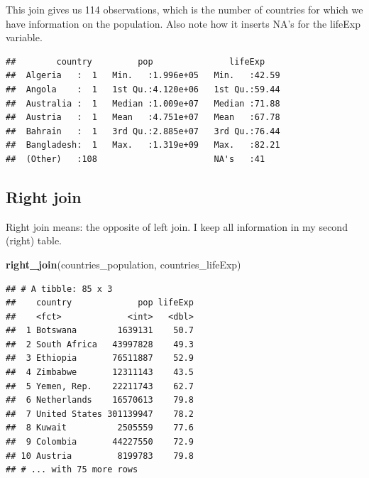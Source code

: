 \documentclass[]{tufte-book}
\newenvironment{Shaded}{}{}
\newcommand{\KeywordTok}[1]{\textcolor[rgb]{0.00,0.44,0.13}{\textbf{#1}}}
\newcommand{\NormalTok}[1]{#1}
\newcommand{\OperatorTok}[1]{\textcolor[rgb]{0.40,0.40,0.40}{#1}}
\newcommand{\StringTok}[1]{\textcolor[rgb]{0.25,0.44,0.63}{#1}}
\begin{document}
This join gives us 114 observations, which is the number of countries for which we have information on the population. Also note how it inserts NA's for the lifeExp variable.

\begin{Shaded}
\end{Shaded}

\begin{verbatim}
##        country         pop               lifeExp     
##  Algeria   :  1   Min.   :1.996e+05   Min.   :42.59  
##  Angola    :  1   1st Qu.:4.120e+06   1st Qu.:59.44  
##  Australia :  1   Median :1.009e+07   Median :71.88  
##  Austria   :  1   Mean   :4.751e+07   Mean   :67.78  
##  Bahrain   :  1   3rd Qu.:2.885e+07   3rd Qu.:76.44  
##  Bangladesh:  1   Max.   :1.319e+09   Max.   :82.21  
##  (Other)   :108                       NA's   :41
\end{verbatim}

\hypertarget{right-join}{%
\subsection{Right join}\label{right-join}}

Right join means: the opposite of left join. I keep all information in my second (right) table.

\begin{Shaded}
\begin{Highlighting}[]
\KeywordTok{right_join}\NormalTok{(countries_population, countries_lifeExp)}
\end{Highlighting}
\end{Shaded}

\begin{verbatim}
## # A tibble: 85 x 3
##    country             pop lifeExp
##    <fct>             <int>   <dbl>
##  1 Botswana        1639131    50.7
##  2 South Africa   43997828    49.3
##  3 Ethiopia       76511887    52.9
##  4 Zimbabwe       12311143    43.5
##  5 Yemen, Rep.    22211743    62.7
##  6 Netherlands    16570613    79.8
##  7 United States 301139947    78.2
##  8 Kuwait          2505559    77.6
##  9 Colombia       44227550    72.9
## 10 Austria         8199783    79.8
## # ... with 75 more rows
\end{verbatim}
\end{document}
